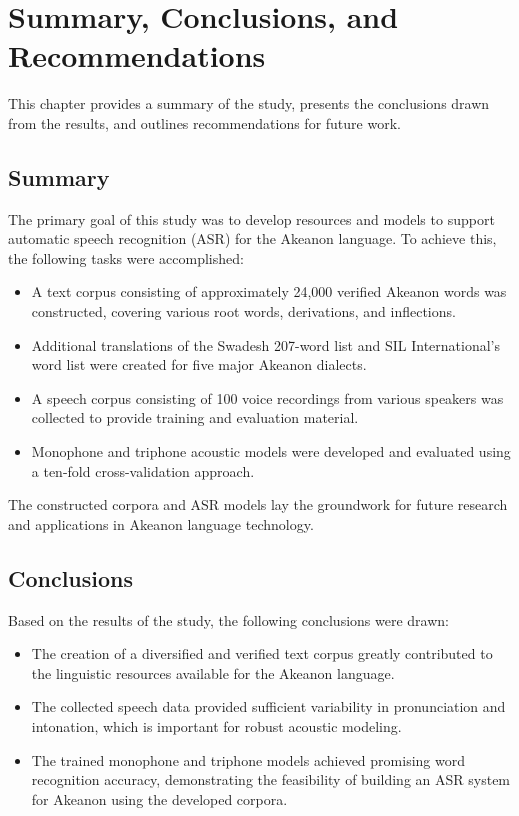 \chapter{Summary, Conclusions, and Recommendations}

This chapter provides a summary of the study, presents the conclusions drawn from the results, and outlines recommendations for future work.

\section{Summary}

The primary goal of this study was to develop resources and models to support automatic speech recognition (ASR) for the Akeanon language. To achieve this, the following tasks were accomplished:
\begin{itemize}
    \item A text corpus consisting of approximately 24,000 verified Akeanon words was constructed, covering various root words, derivations, and inflections.
    \item Additional translations of the Swadesh 207-word list and SIL International's word list were created for five major Akeanon dialects.
    \item A speech corpus consisting of 100 voice recordings from various speakers was collected to provide training and evaluation material.
    \item Monophone and triphone acoustic models were developed and evaluated using a ten-fold cross-validation approach.
\end{itemize}

The constructed corpora and ASR models lay the groundwork for future research and applications in Akeanon language technology.

\section{Conclusions}

Based on the results of the study, the following conclusions were drawn:
\begin{itemize}
    \item The creation of a diversified and verified text corpus greatly contributed to the linguistic resources available for the Akeanon language.
    \item The collected speech data provided sufficient variability in pronunciation and intonation, which is important for robust acoustic modeling.
    \item The trained monophone and triphone models achieved promising word recognition accuracy, demonstrating the feasibility of building an ASR system for Akeanon using the developed corpora.
\end{itemize}

